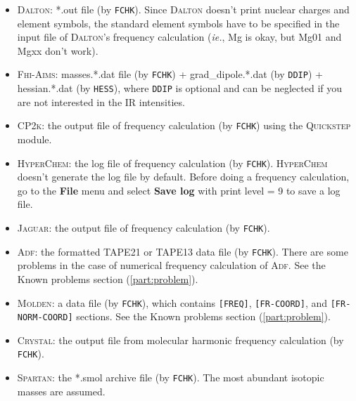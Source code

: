 \documentclass[12pt,english]{extarticle}
\begin{document}
\begin{itemize}
\item \textsc{Dalton}: *.out file (by \verb|FCHK|). Since \textsc{Dalton} doesn't print nuclear
charges and element symbols, the standard element symbols have to be
specified in the input file of \textsc{Dalton}'s frequency calculation (\emph{ie.}, Mg is
okay, but Mg01 and Mgxx don't work).
\item \textsc{Fhi-Aims}: masses.*.dat file (by \verb|FCHK|) + grad{\_}dipole.*.dat (by
\verb|DDIP|) + hessian.*.dat (by \verb|HESS|), where \verb|DDIP| is
optional and can be neglected if you are not interested in the IR
intensities.
\item \textsc{CP2k}: the output file of frequency calculation (by \verb|FCHK|) using the
\textsc{Quickstep} module.
\item \textsc{HyperChem}: the log file of frequency calculation (by \verb|FCHK|).
\textsc{HyperChem} doesn't generate the log file by default. Before doing a frequency
calculation, go to the \textbf{File} menu and select \textbf{Save log} with print level = 9 to save a
log file.
\item \textsc{Jaguar}: the output file of frequency calculation (by \verb|FCHK|).
\item \textsc{Adf}: the formatted TAPE21 or TAPE13 data file (by \verb|FCHK|). There are
some problems in the case of numerical frequency calculation of \textsc{Adf}. See the
Known problems section (\ref{part:problem}).
\item \textsc{Molden}: a data file (by \verb|FCHK|), which contains \verb|[FREQ]|,
\verb|[FR-COORD]|, and \verb|[FR-NORM-COORD]| sections.
See the Known problems section (\ref{part:problem}).
\item \textsc{Crystal}: the output file from molecular harmonic frequency calculation (by \verb|FCHK|).
\item \textsc{Spartan}: the *.smol archive file (by \verb|FCHK|). The most abundant isotopic masses are assumed.

\end{itemize}
\end{document}

